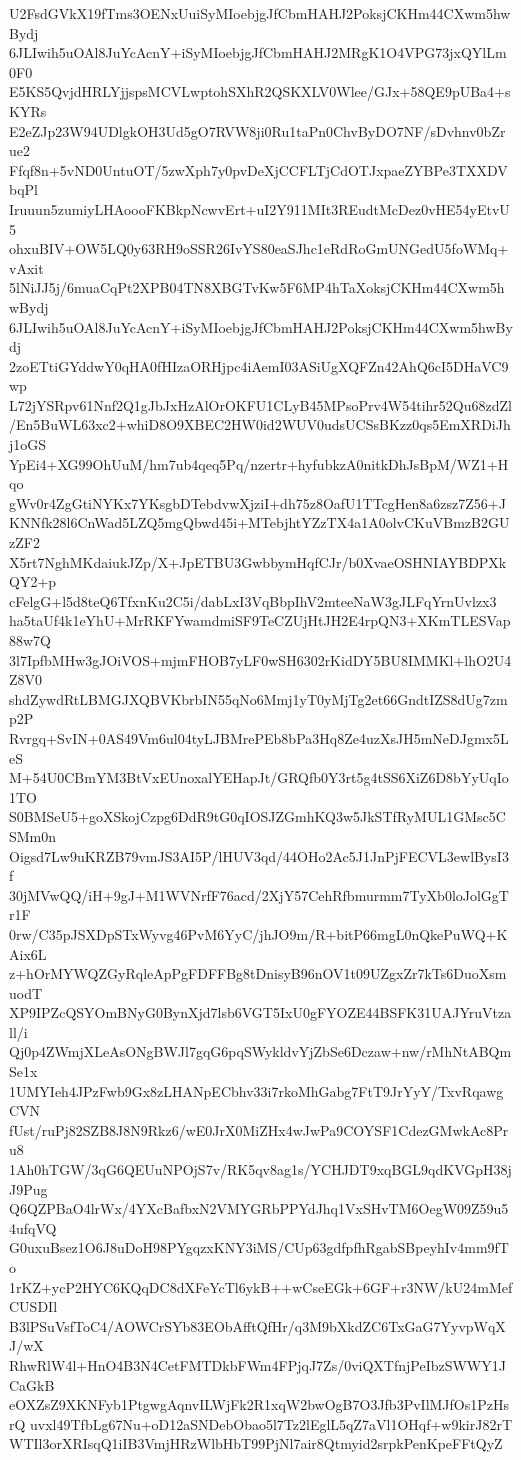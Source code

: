 U2FsdGVkX19fTms3OENxUuiSyMIoebjgJfCbmHAHJ2PoksjCKHm44CXwm5hwBydj
6JLIwih5uOAl8JuYcAcnY+iSyMIoebjgJfCbmHAHJ2MRgK1O4VPG73jxQYlLm0F0
E5KS5QvjdHRLYjjspsMCVLwptohSXhR2QSKXLV0Wlee/GJx+58QE9pUBa4+sKYRs
E2eZJp23W94UDlgkOH3Ud5gO7RVW8ji0Ru1taPn0ChvByDO7NF/sDvhnv0bZrue2
Ffqf8n+5vND0UntuOT/5zwXph7y0pvDeXjCCFLTjCdOTJxpaeZYBPe3TXXDVbqPl
Iruuun5zumiyLHAoooFKBkpNcwvErt+uI2Y911MIt3REudtMcDez0vHE54yEtvU5
ohxuBIV+OW5LQ0y63RH9oSSR26IvYS80eaSJhc1eRdRoGmUNGedU5foWMq+vAxit
5lNiJJ5j/6muaCqPt2XPB04TN8XBGTvKw5F6MP4hTaXoksjCKHm44CXwm5hwBydj
6JLIwih5uOAl8JuYcAcnY+iSyMIoebjgJfCbmHAHJ2PoksjCKHm44CXwm5hwBydj
2zoETtiGYddwY0qHA0fHIzaORHjpc4iAemI03ASiUgXQFZn42AhQ6cI5DHaVC9wp
L72jYSRpv61Nnf2Q1gJbJxHzAlOrOKFU1CLyB45MPsoPrv4W54tihr52Qu68zdZl
/En5BuWL63xc2+whiD8O9XBEC2HW0id2WUV0udsUCSsBKzz0qs5EmXRDiJhj1oGS
YpEi4+XG99OhUuM/hm7ub4qeq5Pq/nzertr+hyfubkzA0nitkDhJsBpM/WZ1+Hqo
gWv0r4ZgGtiNYKx7YKsgbDTebdvwXjziI+dh75z8OafU1TTcgHen8a6zsz7Z56+J
KNNfk28l6CnWad5LZQ5mgQbwd45i+MTebjhtYZzTX4a1A0olvCKuVBmzB2GUzZF2
X5rt7NghMKdaiukJZp/X+JpETBU3GwbbymHqfCJr/b0XvaeOSHNIAYBDPXkQY2+p
cFelgG+l5d8teQ6TfxnKu2C5i/dabLxI3VqBbpIhV2mteeNaW3gJLFqYrnUvlzx3
ha5taUf4k1eYhU+MrRKFYwamdmiSF9TeCZUjHtJH2E4rpQN3+XKmTLESVap88w7Q
3l7IpfbMHw3gJOiVOS+mjmFHOB7yLF0wSH6302rKidDY5BU8IMMKl+lhO2U4Z8V0
shdZywdRtLBMGJXQBVKbrbIN55qNo6Mmj1yT0yMjTg2et66GndtIZS8dUg7zmp2P
Rvrgq+SvIN+0AS49Vm6ul04tyLJBMrePEb8bPa3Hq8Ze4uzXsJH5mNeDJgmx5LeS
M+54U0CBmYM3BtVxEUnoxalYEHapJt/GRQfb0Y3rt5g4tSS6XiZ6D8bYyUqIo1TO
S0BMSeU5+goXSkojCzpg6DdR9tG0qIOSJZGmhKQ3w5JkSTfRyMUL1GMsc5CSMm0n
Oigsd7Lw9uKRZB79vmJS3AI5P/lHUV3qd/44OHo2Ac5J1JnPjFECVL3ewlBysI3f
30jMVwQQ/iH+9gJ+M1WVNrfF76acd/2XjY57CehRfbmurmm7TyXb0loJolGgTr1F
0rw/C35pJSXDpSTxWyvg46PvM6YyC/jhJO9m/R+bitP66mgL0nQkePuWQ+KAix6L
z+hOrMYWQZGyRqleApPgFDFFBg8tDnisyB96nOV1t09UZgxZr7kTs6DuoXsmuodT
XP9IPZcQSYOmBNyG0BynXjd7lsb6VGT5IxU0gFYOZE44BSFK31UAJYruVtzall/i
Qj0p4ZWmjXLeAsONgBWJl7gqG6pqSWykldvYjZbSe6Dczaw+nw/rMhNtABQmSe1x
1UMYIeh4JPzFwb9Gx8zLHANpECbhv33i7rkoMhGabg7FtT9JrYyY/TxvRqawgCVN
fUst/ruPj82SZB8J8N9Rkz6/wE0JrX0MiZHx4wJwPa9COYSF1CdezGMwkAc8Pru8
1Ah0hTGW/3qG6QEUuNPOjS7v/RK5qv8ag1s/YCHJDT9xqBGL9qdKVGpH38jJ9Pug
Q6QZPBaO4lrWx/4YXcBafbxN2VMYGRbPPYdJhq1VxSHvTM6OegW09Z59u54ufqVQ
G0uxuBsez1O6J8uDoH98PYgqzxKNY3iMS/CUp63gdfpfhRgabSBpeyhIv4mm9fTo
1rKZ+ycP2HYC6KQqDC8dXFeYcTl6ykB++wCseEGk+6GF+r3NW/kU24mMefCUSDIl
B3lPSuVsfToC4/AOWCrSYb83EObAfftQfHr/q3M9bXkdZC6TxGaG7YyvpWqXJ/wX
RhwRlW4l+HnO4B3N4CetFMTDkbFWm4FPjqJ7Zs/0viQXTfnjPeIbzSWWY1JCaGkB
eOXZsZ9XKNFyb1PtgwgAqnvILWjFk2R1xqW2bwOgB7O3Jfb3PvIlMJfOs1PzHsrQ
uvxl49TfbLg67Nu+oD12aSNDebObao5l7Tz2lEglL5qZ7aVl1OHqf+w9kirJ82rT
WTIl3orXRIsqQ1iIB3VmjHRzWlbHbT99PjNl7air8Qtmyid2srpkPenKpeFFtQyZ
